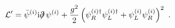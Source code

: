 \begin{equation}
{\cal L}'= \bar{\psi}^{(i)} {\rm i} \partial \!\!\!/ \, \psi^{(i)} +
\frac{g^2}{2} \left(\psi_R^{(i)\dagger}\psi_L^{(i)\dagger} +  \psi_L^{(i)}\psi_R^{(i)}\right)^2 \ .
\label{eq12p}
\end{equation}

